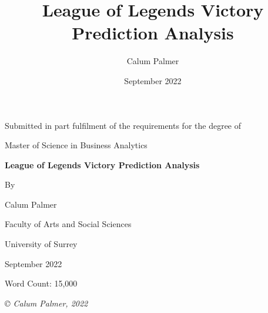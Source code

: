 \documentclass[12pt,a4 paper]{report}
\title{League of Legends Victory Prediction Analysis}
\author{Calum Palmer}
\date{September 2022}
\begin{document}
    \begin{titlepage}
    \centering
        {\large Submitted in part fulfilment of the requirements for the degree of}


        {\Large Master of Science in Business Analytics}

    \vspace{2cm}
        {\huge\bfseries League of Legends Victory Prediction Analysis}

    \vspace{1.5cm}
        {By}

    \vspace{0.5cm}
        {\Large Calum Palmer}

    \vspace{5cm}
        {\large Faculty of Arts and Social Sciences}

    \vspace{0.25cm}
        {\large University of Surrey}

    \vspace{1cm}
        {\large September 2022}

    \vspace{1.5cm}
        {\large Word Count: 15,000}

    \vfill
        {\itshape © Calum Palmer, 2022}

    \end{titlepage}

    \setcounter{page}{2}

    


    

    \tableofcontents
    \listoffigures
    \listoftables
    \printacronyms
    \newpage
\end{document}
